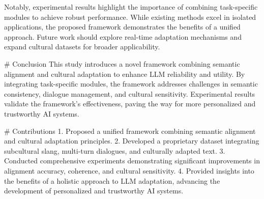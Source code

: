 Notably, experimental results highlight the importance of combining task-specific modules to achieve robust performance. While existing methods excel in isolated applications, the proposed framework demonstrates the benefits of a unified approach. Future work should explore real-time adaptation mechanisms and expand cultural datasets for broader applicability.

# Conclusion
This study introduces a novel framework combining semantic alignment and cultural adaptation to enhance LLM reliability and utility. By integrating task-specific modules, the framework addresses challenges in semantic consistency, dialogue management, and cultural sensitivity. Experimental results validate the framework's effectiveness, paving the way for more personalized and trustworthy AI systems. 

# Contributions
1. Proposed a unified framework combining semantic alignment and cultural adaptation principles.
2. Developed a proprietary dataset integrating subcultural slang, multi-turn dialogues, and culturally adapted text.
3. Conducted comprehensive experiments demonstrating significant improvements in alignment accuracy, coherence, and cultural sensitivity.
4. Provided insights into the benefits of a holistic approach to LLM adaptation, advancing the development of personalized and trustworthy AI systems.